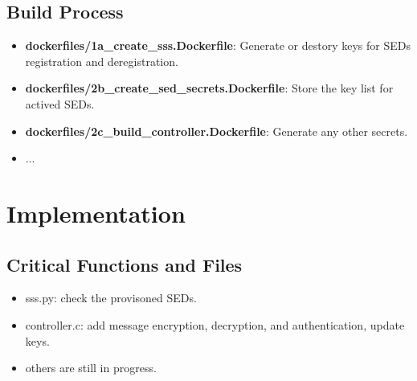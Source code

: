 \documentclass[11pt,oneside,onecolumn,letterpaper]{article}
\begin{document}
\subsection{Build Process}

  \begin{itemize}
    \item \textbf{dockerfiles/1a\_create\_sss.Dockerfile}: Generate or destory keys for SEDs registration and deregistration.
    \item \textbf{dockerfiles/2b\_create\_sed\_secrets.Dockerfile}: Store the key list for actived SEDs.
    \item \textbf{dockerfiles/2c\_build\_controller.Dockerfile}: Generate any other secrets.
    \item ...
  \end{itemize}

\section{Implementation}
\subsection{Critical Functions and Files}
\begin{itemize}
  \item sss.py: check the provisoned SEDs.
  \item controller.c: add message encryption, decryption, and authentication, update keys.
  \item others are still in progress.
\end{itemize}



\end{document}
